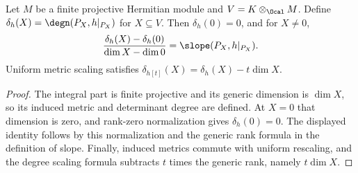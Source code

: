 \begin{lemma}
\label{lem:intrinsic-subspace-degree}
\leanok
Let $M$ be a finite projective Hermitian module and $V=K\otimes_\Ocal M$.
Define $\delta_h(X)=\degn(P_X,h|_{P_X})$ for $X\subseteq V$.
Then $\delta_h(0)=0$, and for $X\ne0$,
\[
 \frac{\delta_h(X)-\delta_h(0)}{\dim X-\dim0}
 =\slope(P_X,h|_{P_X}).
\]
Uniform metric scaling satisfies
$\delta_{h[t]}(X)=\delta_h(X)-t\dim X$.
\end{lemma}
\begin{proof}
The integral part is finite projective and its generic dimension is
$\dim X$, so its induced metric and determinant degree are defined.
At $X=0$ that dimension is zero, and rank-zero normalization gives
$\delta_h(0)=0$. The displayed identity follows by this normalization
and the generic rank formula in the definition of slope. Finally,
induced metrics commute with uniform rescaling, and the degree scaling
formula subtracts $t$ times the generic rank, namely $t\dim X$.
\end{proof}

